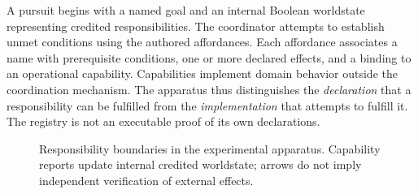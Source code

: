 \documentclass[11pt]{article}
\begin{document}
A pursuit begins with a named goal and an internal Boolean worldstate representing credited responsibilities. The coordinator attempts to establish unmet conditions using the authored affordances. Each affordance associates a name with prerequisite conditions, one or more declared effects, and a binding to an operational capability. Capabilities implement domain behavior outside the coordination mechanism. The apparatus thus distinguishes the \emph{declaration} that a responsibility can be fulfilled from the \emph{implementation} that attempts to fulfill it. The registry is not an executable proof of its own declarations.


\begin{figure}[ht]
\centering
{}
\caption{Responsibility boundaries in the experimental apparatus. Capability reports update internal credited worldstate; arrows do not imply independent verification of external effects.}
\label{fig:architecture}
\end{figure}
\end{document}
